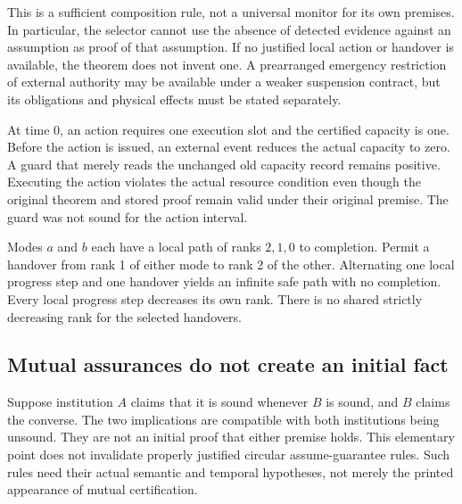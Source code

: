 This is a sufficient composition rule, not a universal monitor for its own premises. In particular, the selector cannot use the absence of detected evidence against an assumption as proof of that assumption. If no justified local action or handover is available, the theorem does not invent one. A prearranged emergency restriction of external authority may be available under a weaker suspension contract, but its obligations and physical effects must be stated separately.

\begin{MScounterexample}\label{MS:ex:stale-certificate}
At time $0$, an action requires one execution slot and the certified capacity is one. Before the action is issued, an external event reduces the actual capacity to zero. A guard that merely reads the unchanged old capacity record remains positive. Executing the action violates the actual resource condition even though the original theorem and stored proof remain valid under their original premise. The guard was not sound for the action interval.
\end{MScounterexample}

\begin{MScounterexample}\label{MS:ex:switching-rank}
Modes $a$ and $b$ each have a local path of ranks $2,1,0$ to completion. Permit a handover from rank 1 of either mode to rank 2 of the other. Alternating one local progress step and one handover yields an infinite safe path with no completion. Every local progress step decreases its own rank. There is no shared strictly decreasing rank for the selected handovers.
\end{MScounterexample}

\subsection{Mutual assurances do not create an initial fact}\label{MS:sec:circular-assurance}

Suppose institution $A$ claims that it is sound whenever $B$ is sound, and $B$ claims the converse. The two implications are compatible with both institutions being unsound. They are not an initial proof that either premise holds. This elementary point does not invalidate properly justified circular assume-guarantee rules. Such rules need their actual semantic and temporal hypotheses, not merely the printed appearance of mutual certification.

